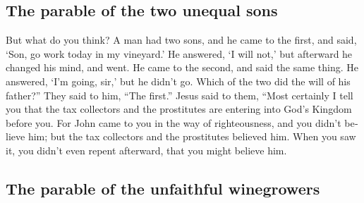 \begin{paracol}{2}
\begin{otherlanguage}{english}
\hypertarget{the-parable-of-the-two-unequal-sons}{%
\subsection{The parable of the two unequal
sons}\label{the-parable-of-the-two-unequal-sons}}

 But what do you think? A man had two sons, and he came
to the first, and said, `Son, go work today in my vineyard.'
 He answered, `I will not,' but afterward he changed his
mind, and went.  He came to the second, and said the same
thing. He answered, `I'm going, sir,' but he didn't go. 
Which of the two did the will of his father?'' They said to him, ``The
first.'' Jesus said to them, ``Most certainly I tell you that the tax
collectors and the prostitutes are entering into God's Kingdom before
you.  For John came to you in the way of righteousness,
and you didn't believe him; but the tax collectors and the prostitutes
believed him. When you saw it, you didn't even repent afterward, that
you might believe him.

\hypertarget{the-parable-of-the-unfaithful-winegrowers}{%
\subsection{The parable of the unfaithful
winegrowers}\label{the-parable-of-the-unfaithful-winegrowers}}


\end{otherlanguage}
\end{paracol}
